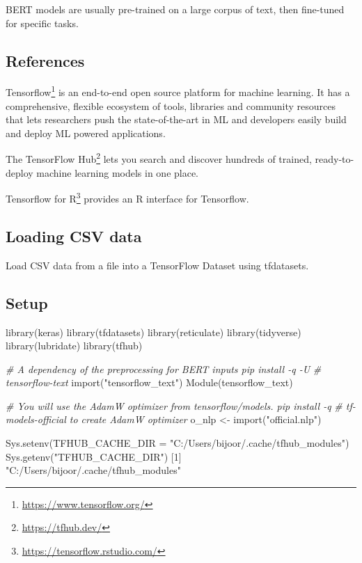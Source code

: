 \documentclass[
]{article}
\newenvironment{Shaded}{}{}
\newcommand{\AttributeTok}[1]{\textcolor[rgb]{0.49,0.56,0.16}{#1}}
\newcommand{\CommentTok}[1]{\textcolor[rgb]{0.38,0.63,0.69}{\textit{#1}}}
\newcommand{\DecValTok}[1]{\textcolor[rgb]{0.25,0.63,0.44}{#1}}
\newcommand{\FunctionTok}[1]{\textcolor[rgb]{0.02,0.16,0.49}{#1}}
\newcommand{\NormalTok}[1]{#1}
\newcommand{\OtherTok}[1]{\textcolor[rgb]{0.00,0.44,0.13}{#1}}
\newcommand{\StringTok}[1]{\textcolor[rgb]{0.25,0.44,0.63}{#1}}
\DeclareRobustCommand{\href}[2]{#2\footnote{\url{#1}}}
\begin{document}
BERT models are usually pre-trained on a large corpus of text, then
fine-tuned for specific tasks.

\hypertarget{references-1}{%
\subsection{References}\label{references-1}}

\href{https://www.tensorflow.org/}{Tensorflow} is an end-to-end open
source platform for machine learning. It has a comprehensive, flexible
ecosystem of tools, libraries and community resources that lets
researchers push the state-of-the-art in ML and developers easily build
and deploy ML powered applications.

The \href{https://tfhub.dev/}{TensorFlow Hub} lets you search and
discover hundreds of trained, ready-to-deploy machine learning models in
one place.

\href{https://tensorflow.rstudio.com/}{Tensorflow for R} provides an R
interface for Tensorflow.

\hypertarget{loading-csv-data}{%
\subsection{Loading CSV data}\label{loading-csv-data}}

Load CSV data from a file into a TensorFlow Dataset using tfdatasets.

\hypertarget{setup}{%
\subsection{Setup}\label{setup}}

\begin{Shaded}
\begin{Highlighting}[]
\FunctionTok{library}\NormalTok{(keras)}
\FunctionTok{library}\NormalTok{(tfdatasets)}
\FunctionTok{library}\NormalTok{(reticulate)}
\FunctionTok{library}\NormalTok{(tidyverse)}
\FunctionTok{library}\NormalTok{(lubridate)}
\FunctionTok{library}\NormalTok{(tfhub)}

\CommentTok{\# A dependency of the preprocessing for BERT inputs pip install {-}q {-}U}
\CommentTok{\# tensorflow{-}text}
\FunctionTok{import}\NormalTok{(}\StringTok{"tensorflow\_text"}\NormalTok{)}
\FunctionTok{Module}\NormalTok{(tensorflow\_text)}

\CommentTok{\# You will use the AdamW optimizer from tensorflow/models.  pip install {-}q}
\CommentTok{\# tf{-}models{-}official to create AdamW optimizer}
\NormalTok{o\_nlp }\OtherTok{\textless{}{-}} \FunctionTok{import}\NormalTok{(}\StringTok{"official.nlp"}\NormalTok{)}

\FunctionTok{Sys.setenv}\NormalTok{(}\AttributeTok{TFHUB\_CACHE\_DIR =} \StringTok{"C:/Users/bijoor/.cache/tfhub\_modules"}\NormalTok{)}
\FunctionTok{Sys.getenv}\NormalTok{(}\StringTok{"TFHUB\_CACHE\_DIR"}\NormalTok{)}
\NormalTok{[}\DecValTok{1}\NormalTok{] }\StringTok{"C:/Users/bijoor/.cache/tfhub\_modules"}
\end{Highlighting}
\end{Shaded}
\end{document}
